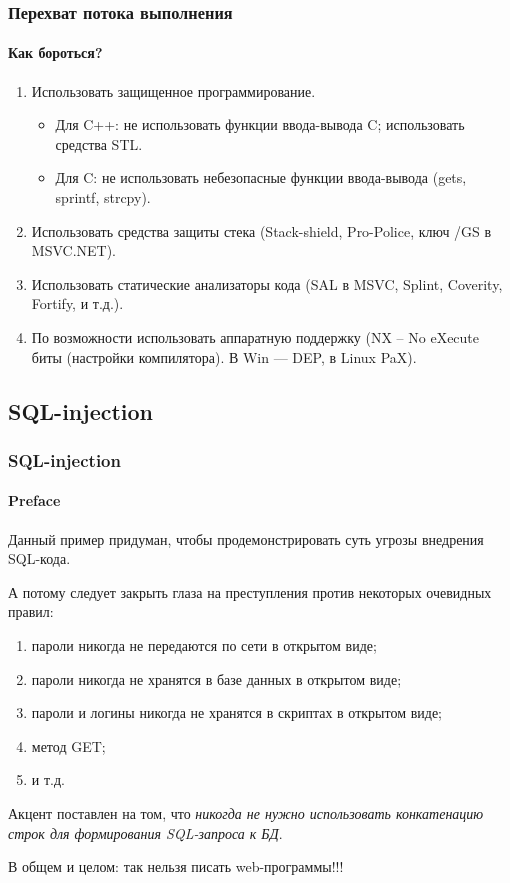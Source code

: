 \begin{frame}
    \frametitle{Перехват потока выполнения}
    \framesubtitle{Как бороться?}
    
    \begin{enumerate}
        \item Использовать защищенное программирование.
        \begin{itemize}
            \item  Для C++: не использовать функции ввода-вывода C; использовать средства STL.
            \item  Для C: не использовать небезопасные функции ввода-вывода (gets, sprintf, strcpy).
        \end{itemize}
        \item Использовать средства защиты стека (Stack-shield, Pro-Police, ключ /GS в MSVC.NET). 
        \item Использовать статические анализаторы кода (SAL в MSVC, Splint, Coverity, Fortify, и т.д.).
        \item По возможности использовать аппаратную поддержку (NX -- No eXecute биты (настройки компилятора). В Win --- DEP, в Linux PaX).
    \end{enumerate}
\end{frame}



\subsection{SQL-injection}

\begin{frame}
    \frametitle{SQL-injection}
    \framesubtitle{Preface}
    
    Данный пример придуман, чтобы продемонстрировать суть угрозы \alert{внедрения SQL-кода}.
    
    А потому следует закрыть глаза на преступления против некоторых очевидных правил:
    \begin{enumerate}
        \item пароли никогда не передаются по сети в открытом виде;
        \item пароли никогда не хранятся в базе данных в открытом виде;
        \item пароли и логины никогда не хранятся в скриптах в открытом виде;
        \item метод GET;
        \item и т.д.
    \end{enumerate}

    \alert{Акцент} поставлен на том, что \emph{никогда не нужно использовать \alert{конкатенацию строк} для формирования SQL-запроса к БД}.
    
    В общем и целом: \alert{так нельзя писать web-программы!!!}
\end{frame}

